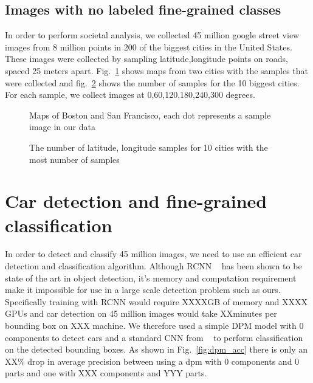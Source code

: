 \documentclass[10pt,twocolumn,letterpaper]{article}
\begin{document}
\subsection{Images with no labeled fine-grained classes}
In order to perform societal analysis, we collected 45 million google street view images from 8 million points in 200 of the biggest cities in the United States. These images were collected by sampling latitude,longitude points on roads, spaced 25 meters apart. Fig.~\ref{fig:dataset4} shows maps from two cities with the samples that were collected and fig.~\ref{fig:dataset5} shows the number of samples for the 10 biggest cities. For each sample, we collect images at 0,60,120,180,240,300 degrees.

\begin{figure}[t]
\begin{center}
\fbox{\rule{0pt}{2in} \rule{0.9\linewidth}{0pt}}
\end{center}
   \caption{Maps of Boston and San Francisco, each dot represents a sample image in our data}
\label{fig:dataset4}
\end{figure}

\begin{figure}[t]
\begin{center}
\fbox{\rule{0pt}{2in} \rule{0.9\linewidth}{0pt}}
\end{center}
   \caption{The number of latitude, longitude samples for 10 cities with the most number of samples}
\label{fig:dataset5}
\end{figure}

\section{Car detection and fine-grained classification}
In order to detect and classify 45 million images, we need to use an efficient car detection and classification algorithm. Although RCNN ~\cite{rcnn} has been shown to be state of the art in object detection, it's memory and computation requirement make it impossible for use in a large scale detection problem such as ours. Specifically training with RCNN  would require XXXXGB of memory and XXXX GPUs and car detection on 45 million images would take XXminutes per bounding box on XXX machine. We therefore used a simple DPM model with 0 components to detect cars and a standard CNN from ~\cite{alexnet} to perform classification on the detected bounding boxes. As shown in Fig.~\ref{fig:dpm_acc} there is only an XX\% drop in average precision between using a dpm with 0 components and 0 parts and one with XXX components and YYY parts.
\end{document}
